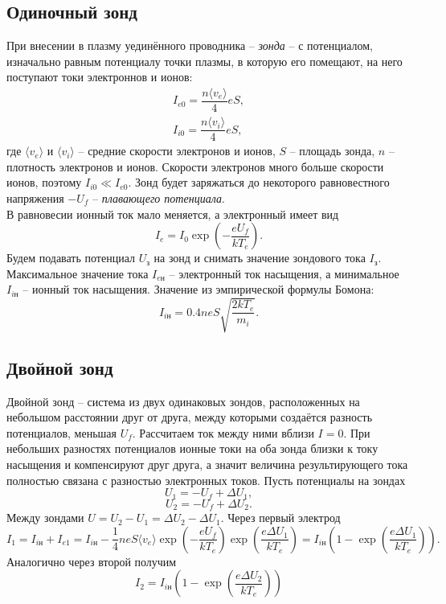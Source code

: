 \documentclass[a4paper,11pt]{extarticle} %
\begin{document}
\subsection*{Одиночный зонд}
При внесении в плазму уединённого проводника -- \textit{зонда} -- с потенциалом, изначально равным потенциалу точки плазмы, в которую его помещают, на него поступают токи электроннов и ионов:
\begin{equation}
\begin{array}{c}
I_{e0} = \dfrac{n \langle v_e \rangle}{4}eS,\\
I_{i0} = \dfrac{n \langle v_i \rangle}{4}eS,
\end{array}
\end{equation}
где $\langle v_e \rangle$ и $\langle v_i \rangle$ -- средние скорости электронов и ионов, $S$ -- площадь зонда, $n$ -- плотность электронов и ионов. Скорости электронов много больше скорости ионов, поэтому $I_{i0} \ll I_{e0}$. Зонд будет заряжаться до некоторого равновестного напряжения $-U_f$ -- \textit{плавающего потенциала}.\\
В равновесии ионный ток мало меняется, а электронный имеет вид
$$
I_e = I_0 \exp\left( -\dfrac{eU_f}{kT_e} \right).
$$
Будем подавать потенциал $U_\text{з}$ на зонд и снимать значение зондового тока $I_\text{з}$. Максимальное значение тока $I_{e\text{н}}$ -- электронный ток насыщения, а минимальное $I_{i\text{н}}$ -- ионный ток насыщения. Значение из эмпирической формулы Бомона:
\begin{equation}
I_{i\text{н}} = 0.4 neS \sqrt{\dfrac{2kT_e}{m_i}}.
\end{equation}
\subsection*{Двойной зонд}
Двойной зонд -- система из двух одинаковых зондов, расположенных на небольшом расстоянии друг от друга, между которыми создаётся разность потенциалов, меньшая $U_f$. Рассчитаем ток между ними вблизи $I=0$. При небольших разностях потенциалов ионные токи на оба зонда близки к току насыщения и компенсируют друг друга, а значит величина результирующего тока полностью связана с разностью электронных токов. Пусть потенциалы на зондах
$$
U_1 = -U_f + \Delta U_1,
$$
$$
U_2 = -U_f + \Delta U_2.
$$
Между зондами $U = U_2 - U_1 = \Delta U_2 - \Delta U_1$.
Через первый электрод
\begin{equation}
I_1 = I_{i\text{н}} + I_{e1} = I_{i\text{н}} - \dfrac{1}{4}neS\langle v_e\rangle \exp\left(-\dfrac{eU_f}{kT_e}\right)\exp\left(\dfrac{e\Delta U_1}{kT_e}\right)=I_{i\text{н}}\left(1 - \exp\left( \dfrac{e\Delta U_1}{kT_e} \right)\right).
\end{equation}
Аналогично через второй получим
\begin{equation}
I_2 = I_{i\text{н}}\left(1 - \exp\left( \dfrac{e\Delta U_2}{kT_e} \right)\right)
\end{equation}
  
\end{document}
